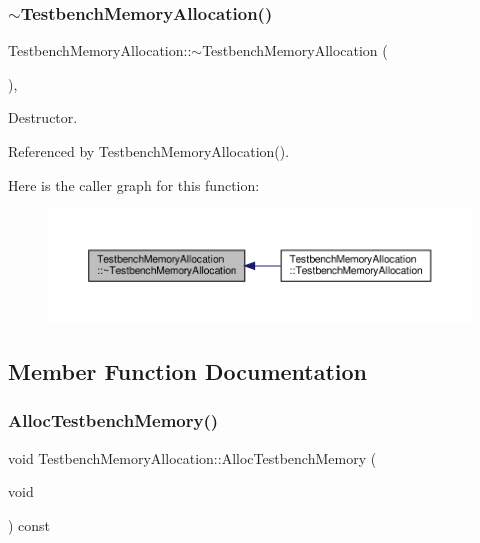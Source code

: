\subsubsection{\texorpdfstring{$\sim$\+Testbench\+Memory\+Allocation()}{~TestbenchMemoryAllocation()}}
{\footnotesize\ttfamily Testbench\+Memory\+Allocation\+::$\sim$\+Testbench\+Memory\+Allocation (\begin{DoxyParamCaption}{ }\end{DoxyParamCaption})\hspace{0.3cm}{\ttfamily [override]}, {\ttfamily [default]}}



Destructor. 



Referenced by Testbench\+Memory\+Allocation().

Here is the caller graph for this function\+:
\nopagebreak
\begin{figure}[H]
\begin{center}
\leavevmode
\includegraphics[width=350pt]{dc/d25/classTestbenchMemoryAllocation_af738ba6ce2b3d84c1ab6be279faafdb5_icgraph}
\end{center}
\end{figure}


\subsection{Member Function Documentation}
\mbox{\label{classTestbenchMemoryAllocation_a3575bb53a3cd98bce82a358a8e506aca}} 
\subsubsection{\texorpdfstring{Alloc\+Testbench\+Memory()}{AllocTestbenchMemory()}}
{\footnotesize\ttfamily void Testbench\+Memory\+Allocation\+::\+Alloc\+Testbench\+Memory (\begin{DoxyParamCaption}\item[{void}]{ }\end{DoxyParamCaption}) const\hspace{0.3cm}{\ttfamily [protected]}}



